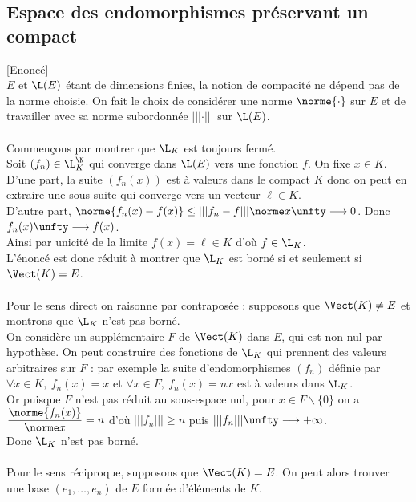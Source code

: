 \documentclass{book}
\begin{document}
	\subsection{Espace des endomorphismes préservant un compact }
	\label{Espace des endomorphismes préservant un compact corrigé}
	\textcolor{blue}{\hyperref[Espace des endomorphismes préservant un compact]{[Enoncé]}}\\
	$E$ et $\L(E)$ étant de dimensions finies, la notion de compacité ne dépend pas de la norme choisie. On fait le choix de considérer une norme $\norme{\cdot}$ sur $E$ et de travailler avec sa norme subordonnée $|||\cdot|||$ sur $\L(E)$.\\\\
	Commençons par montrer que $\L_K$ est toujours fermé.\\
	Soit $(f_n)\in \L_K^\N$ qui converge dans $\L(E)$ vers une fonction $f$. On fixe $x\in K$.\\
	D'une part, la suite $(f_n(x))$ est à valeurs dans le compact $K$ donc on peut en extraire une sous-suite qui converge vers un vecteur $\ell\in K$.\\
	D'autre part, $\norme{f_n(x)-f(x)}\leq |||f_n-f|||\norme x\unfty\longrightarrow 0$. Donc $f_n(x)\unfty\longrightarrow f(x)$.\\
	Ainsi par unicité de la limite $f(x)=\ell\in K$ d'où $f\in \L_K$.\\
	L'énoncé est donc réduit à montrer que $\L_K$ est borné si et seulement si $\Vect(K)=E$.\\\\
	Pour le sens direct on raisonne par contraposée : supposons que $\Vect(K)\ne E$ et montrons que $\L_K$ n'est pas borné.\\
	On considère un supplémentaire $F$ de $\Vect(K)$ dans $E$, qui est non nul par hypothèse. On peut construire des fonctions de $\L_K$ qui prennent des valeurs arbitraires sur $F$ : par exemple la suite d'endomorphismes $(f_n)$ définie par $\forall x\in K,\ f_n(x)=x$ et $\forall x\in F,\ f_n(x)=nx$ est à valeurs dans $\L_K$.\\
	Or puisque $F$ n'est pas réduit au sous-espace nul, pour $x\in F\backslash\{0\}$ on a $\dfrac{\norme{f_n(x)}}{\norme x}=n$ d'où $|||f_n|||\geq n$ puis $|||f_n|||\unfty\longrightarrow +\infty$.\\
	Donc $\L_K$ n'est pas borné.\\\\
	Pour le sens réciproque, supposons que $\Vect(K)=E$. On peut alors trouver une base $(e_1,\dots,e_n)$ de $E$ formée d'éléments de $K$.\\
\end{document}
